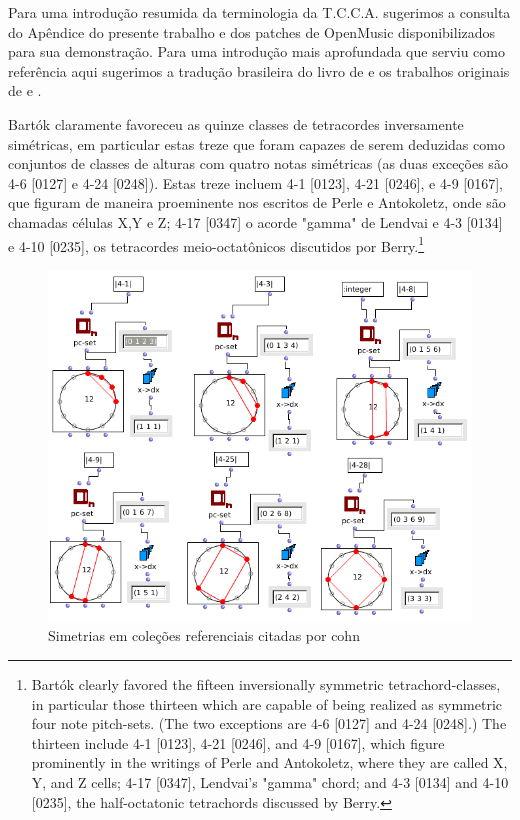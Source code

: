 \documentclass[
	12pt,				%
	openright,			%
	twoside,			%
	a4paper,			%
	english,			%
	french,				%
	spanish,			%
	brazil				%
	]{abntex2}
\begin{document}
Para uma introdução resumida da terminologia da T.C.C.A. sugerimos a consulta do Apêndice do presente trabalho e dos patches de OpenMusic disponibilizados para sua demonstração. Para uma introdução mais aprofundada que serviu como referência aqui sugerimos a tradução brasileira do livro de  e os trabalhos originais de  e .

\begin{citacao}

Bartók claramente favoreceu as quinze classes de tetracordes inversamente simétricas, em particular estas treze que foram capazes de serem deduzidas como conjuntos de classes de alturas com quatro notas simétricas (as duas exceções são 4-6 [0127] e 4-24 [0248]). Estas treze incluem  4-1 [0123], 4-21 [0246], e 4-9 [0167], que figuram de maneira proeminente nos escritos de Perle e Antokoletz, onde são chamadas células X,Y e Z; 4-17 [0347] o acorde "gamma" de Lendvai e 4-3 [0134] e 4-10 [0235], os tetracordes meio-octatônicos discutidos por Berry.\cite[p. 22]{cohn1988inversional}\footnote{
Bartók clearly favored the fifteen inversionally symmetric tetrachord-classes, in particular those thirteen which are capable of being realized as symmetric four note pitch-sets.
(The two exceptions are 4-6 [0127] and 4-24 [0248].) The thirteen include 4-1 [0123], 4-21 [0246], and 4-9 [0167], which figure prominently in the writings of Perle and Antokoletz, where they are called X, Y, and Z cells; 4-17 [0347], Lendvai's "gamma" chord; and 4-3 [0134] and 4-10 [0235], the half-octatonic tetrachords discussed by Berry.\cite[p. 22]{cohn1988inversional}}
\end{citacao}


\begin{figure}[!h]
	\caption{\label{fig_grafico} Simetrias em coleções referenciais citadas por cohn}
	\begin{center}
	    \includegraphics[scale=0.5]{axis/colecoes_simetricas.png}
	\end{center}
\end{figure}
\end{document}
